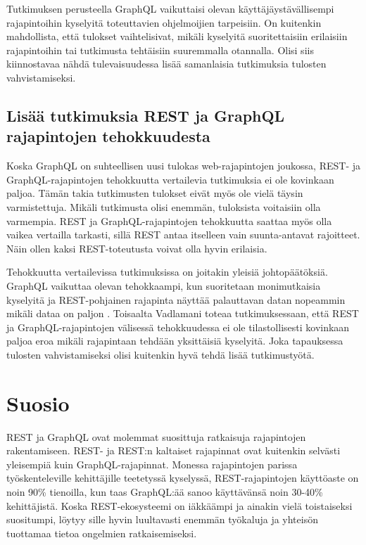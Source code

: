 Tutkimuksen perusteella GraphQL vaikuttaisi olevan käyttäjäystävällisempi rajapintoihin kyselyitä toteuttavien ohjelmoijien tarpeisiin. On kuitenkin mahdollista, että tulokset vaihtelisivat, mikäli kyselyitä suoritettaisiin erilaisiin rajapintoihin tai tutkimusta tehtäisiin suuremmalla otannalla. Olisi siis kiinnostavaa nähdä tulevaisuudessa lisää samanlaisia tutkimuksia tulosten vahvistamiseksi.

\subsection{Lisää tutkimuksia REST ja GraphQL rajapintojen tehokkuudesta}

Koska GraphQL on suhteellisen uusi tulokas web-rajapintojen joukossa, REST- ja GraphQL-rajapintojen tehokkuutta vertailevia tutkimuksia ei ole kovinkaan paljoa. Tämän takia tutkimusten tulokset eivät myös ole vielä täysin varmistettuja. Mikäli tutkimusta olisi enemmän, tuloksista voitaisiin olla varmempia. REST ja GraphQL-rajapintojen tehokkuutta saattaa myös olla vaikea vertailla tarkasti, sillä REST antaa itselleen vain suunta-antavat rajoitteet. Näin ollen kaksi REST-toteutusta voivat olla hyvin erilaisia.

Tehokkuutta vertailevissa tutkimuksissa on joitakin yleisiä johtopäätöksiä. GraphQL vaikuttaa olevan tehokkaampi, kun suoritetaan monimutkaisia kyselyitä ja REST-pohjainen rajapinta näyttää palauttavan datan nopeammin mikäli dataa on paljon \cite{mateusz2020, Seabra2019, helgason2017}. Toisaalta Vadlamani \cite{vadlamani2021} toteaa tutkimuksessaan, että REST ja GraphQL-rajapintojen välisessä tehokkuudessa ei ole tilastollisesti kovinkaan paljoa eroa mikäli rajapintaan tehdään yksittäisiä kyselyitä. Joka tapauksessa tulosten vahvistamiseksi olisi kuitenkin hyvä tehdä lisää tutkimustyötä.

\section{Suosio}

REST ja GraphQL ovat molemmat suosittuja ratkaisuja rajapintojen rakentamiseen. REST- ja REST:n kaltaiset rajapinnat ovat kuitenkin selvästi yleisempiä kuin GraphQL-rajapinnat. Monessa rajapintojen parissa työskenteleville kehittäjille teetetyssä kyselyssä, REST-rajapintojen käyttöaste on noin 90\% tienoilla, kun taas GraphQL:ää sanoo käyttävänsä noin 30-40\% kehittäjistä. Koska REST-ekosysteemi on iäkkäämpi ja ainakin vielä toistaiseksi suositumpi, löytyy sille hyvin luultavasti enemmän työkaluja ja yhteisön tuottamaa tietoa ongelmien ratkaisemiseksi.

